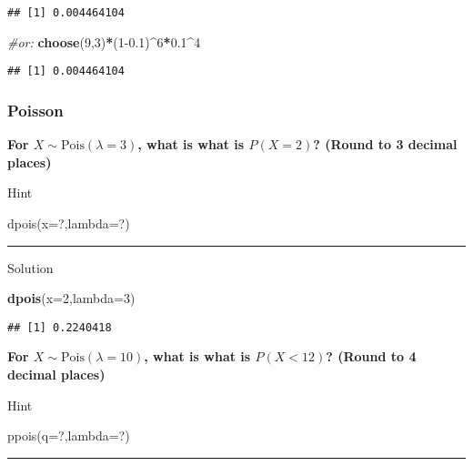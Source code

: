 \documentclass[
]{book}
\newenvironment{Shaded}{\begin{snugshade}}{\end{snugshade}}
\newcommand{\AttributeTok}[1]{\textcolor[rgb]{0.13,0.29,0.53}{#1}}
\newcommand{\CommentTok}[1]{\textcolor[rgb]{0.56,0.35,0.01}{\textit{#1}}}
\newcommand{\DecValTok}[1]{\textcolor[rgb]{0.00,0.00,0.81}{#1}}
\newcommand{\FloatTok}[1]{\textcolor[rgb]{0.00,0.00,0.81}{#1}}
\newcommand{\FunctionTok}[1]{\textcolor[rgb]{0.13,0.29,0.53}{\textbf{#1}}}
\newcommand{\NormalTok}[1]{#1}
\newcommand{\SpecialCharTok}[1]{\textcolor[rgb]{0.81,0.36,0.00}{\textbf{#1}}}
\begin{document}
\begin{verbatim}
## [1] 0.004464104
\end{verbatim}

\begin{Shaded}
\begin{Highlighting}[]
\CommentTok{\#or:}
\FunctionTok{choose}\NormalTok{(}\DecValTok{9}\NormalTok{,}\DecValTok{3}\NormalTok{)}\SpecialCharTok{*}\NormalTok{(}\DecValTok{1}\FloatTok{{-}0.1}\NormalTok{)}\SpecialCharTok{\^{}}\DecValTok{6}\SpecialCharTok{*}\FloatTok{0.1}\SpecialCharTok{\^{}}\DecValTok{4}
\end{Highlighting}
\end{Shaded}

\begin{verbatim}
## [1] 0.004464104
\end{verbatim}

\hypertarget{poisson}{%
\subsubsection{Poisson}\label{poisson}}

\textbf{For \(X \sim \mbox{Pois}(\lambda=3)\), what is what is \(P(X=2)\)? (Round to 3 decimal places)}

Hint

dpois(x=?,lambda=?)

\begin{center}\rule{0.5\linewidth}{0.5pt}\end{center}

Solution

\begin{Shaded}
\begin{Highlighting}[]
\FunctionTok{dpois}\NormalTok{(}\AttributeTok{x=}\DecValTok{2}\NormalTok{,}\AttributeTok{lambda=}\DecValTok{3}\NormalTok{)}
\end{Highlighting}
\end{Shaded}

\begin{verbatim}
## [1] 0.2240418
\end{verbatim}

\textbf{For \(X\sim \mbox{Pois}(\lambda=10)\), what is what is \(P(X<12)\)? (Round to 4 decimal places)}

Hint

ppois(q=?,lambda=?)

\begin{center}\rule{0.5\linewidth}{0.5pt}\end{center}
\end{document}
